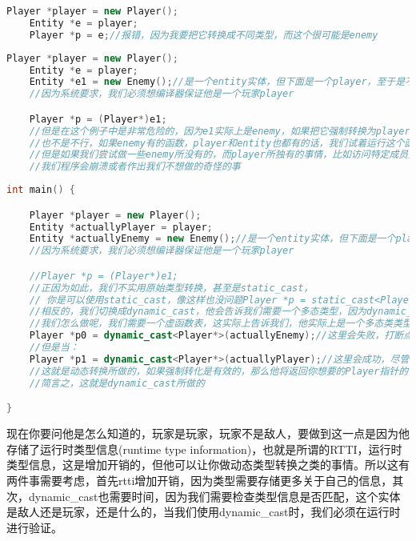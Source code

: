 \begin{lstlisting}[language=c++]
    Player *player = new Player();
    Entity *e = player;
    Player *p = e;//报错，因为我要把它转换成不同类型，而这个很可能是enemy
\end{lstlisting}

\begin{lstlisting}[language=c++]
    Player *player = new Player();
    Entity *e = player;
    Entity *e1 = new Enemy();//是一个entity实体，但下面是一个player，至于是不是enemy我们不知道
    //因为系统要求，我们必须想编译器保证他是一个玩家player

    Player *p = (Player*)e1;
    //但是在这个例子中是非常危险的，因为e1实际上是enemy，如果把它强制转换为player，
    //也不是不行，如果enemy有的函数，player和entity也都有的话，我们试着运行这个函数他可能会没问题，我们深知可能不会注意到任何问题
    //但是如果我们尝试做一些enemy所没有的，而player所独有的事情，比如访问特定成员变量，只有player有，而enemy没有，因为潜在类型实际是enemy
    //我们程序会崩溃或者作出我们不想做的奇怪的事
\end{lstlisting}


\begin{lstlisting}[language=c++]
int main() {

    Player *player = new Player();
    Entity *actuallyPlayer = player;
    Entity *actuallyEnemy = new Enemy();//是一个entity实体，但下面是一个player，至于是不是enemy我们不知道
    //因为系统要求，我们必须想编译器保证他是一个玩家player

    //Player *p = (Player*)e1;
    //正因为如此，我们不实用原始类型转换，甚至是static_cast，
    // 你是可以使用static_cast，像这样也没问题Player *p = static_cast<Player*>(e1);
    //相反的，我们切换成dynamic_cast，他会告诉我们需要一个多态类型，因为dynamic_cast只用于多态类类型
    //我们怎么做呢，我们需要一个虚函数表，这实际上告诉我们，他实际上是一个多态类类型，所以我们可以做这个虚函数
    Player *p0 = dynamic_cast<Player*>(actuallyEnemy);//这里会失败，打断点可以看到指针为NULL
    //但是当：
    Player *p1 = dynamic_cast<Player*>(actuallyPlayer);//这里会成功，尽管他们现在都是Entity
    //这就是动态转换所做的，如果强制转化是有效的，那么他将返回你想要的Player指针的值，但是如果它无效，说明他不是你声称的给定类型，那么他就返回NULL
    //简言之，这就是dynamic_cast所做的

}
\end{lstlisting}

现在你要问他是怎么知道的，玩家是玩家，玩家不是敌人，要做到这一点是因为他存储了运行时类型信息(runtime type information)，也就是所谓的RTTI，运行时类型信息，这是增加开销的，但他可以让你做动态类型转换之类的事情。所以这有两件事需要考虑，首先rtti增加开销，因为类型需要存储更多关于自己的信息，其次，dynamic_cast也需要时间，因为我们需要检查类型信息是否匹配，这个实体是敌人还是玩家，还是什么的，当我们使用dynamic_cast时，我们必须在运行时进行验证。

